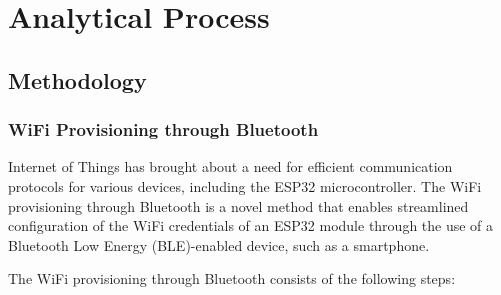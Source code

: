 \section{Analytical Process}\label{sec:analytical_process}

\subsection{Methodology}\label{sec:methodology}

\subsubsection{WiFi Provisioning through Bluetooth}

Internet of Things has brought about a need for efficient communication protocols for various devices, including the ESP32 microcontroller. The WiFi provisioning through Bluetooth is a novel method that enables streamlined configuration of the WiFi credentials of an ESP32 module through the use of a Bluetooth Low Energy (BLE)-enabled device, such as a smartphone.

The WiFi provisioning through Bluetooth consists of the following steps:

